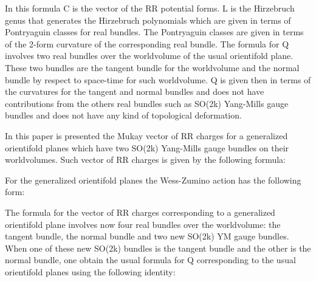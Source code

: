 \documentclass[a4paper,a4paper]{article}
\begin{document}
\begin{center}
{  \coordHE{} }
\end{center}
In this formula C is the vector of the RR potential forms. L is the Hirzebruch genus that generates the Hirzebruch polynomials which are given in
terms of Pontryaguin classes for real bundles. The Pontryaguin classes are given in terms of the 2-form curvature of the corresponding real bundle. The
formula for Q involves two real bundles over the worldvolume of the usual orientifold plane.  These two bundles are the tangent bundle for the worldvolume and the normal bundle by respect to space-time for such worldvolume. Q is given then in terms of the curvatures for the tangent and
normal bundles and does not have contributions  from the others real bundles
such as SO(2k) Yang-Mills gauge bundles and does not have any kind of topological deformation.

In this paper is presented the Mukay vector of RR charges for a generalized
orientifold planes which have two SO(2k) Yang-Mills gauge bundles on their worldvolumes.  Such vector of RR charges is given by the following formula:

\begin{center}
{  \coordHE{} }
\end{center}

For the generalized  orientifold planes the Wess-Zumino action has the following form:

\begin{center}
{  \coordHE{} }
\end{center}

The formula for the vector of RR charges corresponding to a generalized orientifold plane involves now four real bundles over the worldvolume: the 
tangent bundle, the normal bundle and two new SO(2k) YM gauge bundles.
When one of these new SO(2k) bundles is the tangent bundle and the other is the normal bundle, one obtain the usual formula for Q corresponding to the usual orientifold planes using the following identity:
\end{document}
